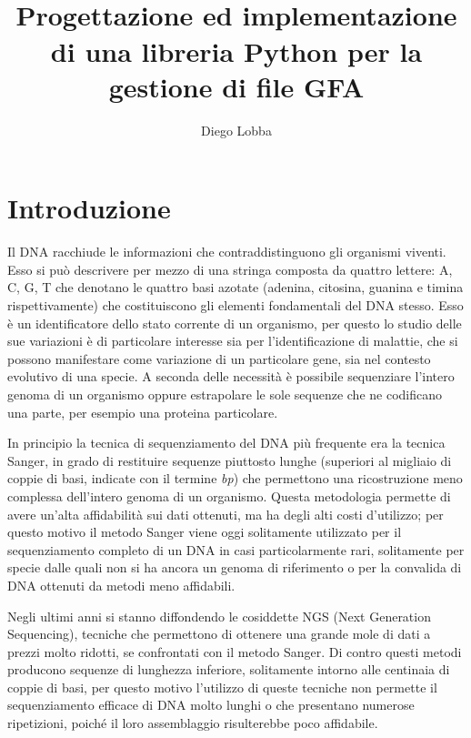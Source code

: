 \documentclass[11pt, a4paper]{book}
\title{\pygfa \\
	Progettazione ed implementazione di una libreria Python per la gestione
	di file GFA}
\author{Diego Lobba}
\begin{document}


\tableofcontents
\listoffigures

\chapter{Introduzione}
\nocite{marx_2013}
Il DNA racchiude le informazioni che contraddistinguono gli organismi
viventi. Esso si può descrivere per mezzo di una stringa composta da quattro
lettere: A, C, G, T che denotano le quattro basi azotate (adenina, citosina,
guanina e timina rispettivamente) che costituiscono gli elementi
fondamentali del DNA stesso. Esso è un identificatore dello stato
corrente di un organismo, per questo lo studio delle sue variazioni
è di particolare interesse sia per l'identificazione di malattie,
che si possono manifestare come variazione di un particolare gene,
sia nel contesto evolutivo di una specie. A seconda delle necessità
è possibile sequenziare l'intero genoma di un organismo oppure estrapolare
le sole sequenze che ne codificano una parte, per esempio una proteina
particolare.

In principio la tecnica di sequenziamento del DNA più frequente era la tecnica
Sanger, in grado di restituire sequenze piuttosto lunghe (superiori al migliaio di
coppie di basi, indicate con il termine \emph{bp}) che permettono una ricostruzione
meno complessa dell'intero genoma di un organismo. Questa metodologia permette
di avere un'alta affidabilità sui dati ottenuti, ma ha degli alti costi d'utilizzo;
per questo motivo il metodo Sanger viene oggi solitamente utilizzato per
il sequenziamento completo di un DNA in casi particolarmente rari,
solitamente per specie dalle quali non si ha ancora un genoma di riferimento
o per la convalida di DNA ottenuti da metodi meno affidabili.

Negli ultimi anni si stanno diffondendo le cosiddette NGS (Next Generation Sequencing),
tecniche che permettono di ottenere una grande mole di dati
a prezzi molto ridotti, se confrontati con il metodo Sanger. Di contro questi
metodi producono sequenze di lunghezza inferiore, solitamente
intorno alle centinaia di coppie di basi, per questo motivo l'utilizzo di queste
tecniche non permette il sequenziamento efficace di DNA molto lunghi o che
presentano numerose ripetizioni, poiché il loro assemblaggio
risulterebbe poco affidabile.
\end{document}
